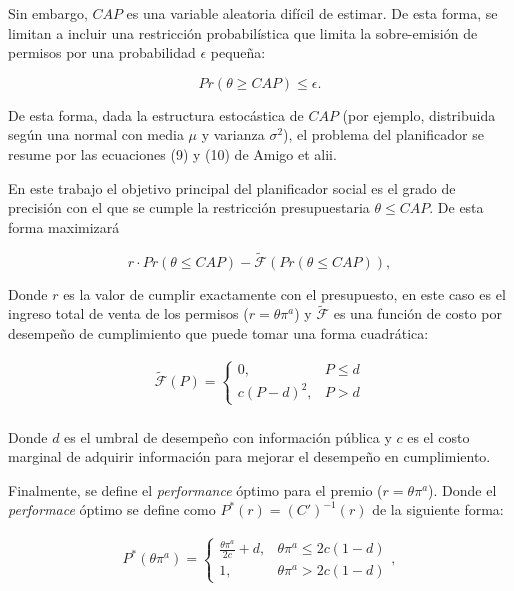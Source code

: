 Sin embargo, $CAP$ es una variable aleatoria difícil de estimar. De esta forma,  se limitan a incluir una restricción probabilística que limita la sobre-emisión de permisos por una probabilidad $\epsilon$ pequeña:

$$Pr(\theta\geq CAP)\leq\epsilon.$$

De esta forma, dada la estructura estocástica de $CAP$ (por ejemplo, distribuida según una normal con media $\mu$ y varianza $\sigma^2$), el problema del planificador se resume por las ecuaciones (9) y (10) de Amigo et alii.
\vspace{2.5mm}

En este trabajo el objetivo principal del planificador social es el grado de precisión con el que se cumple la restricción presupuestaria $\theta\leq CAP$. De esta forma maximizará

$$r\cdot Pr(\theta\leq CAP)-\tilde{\mathcal{F}}(Pr(\theta\leq CAP)),$$ \label{nuevafposible}

Donde $r$ es la valor de cumplir exactamente con el presupuesto, en este caso es el ingreso total de venta de los permisos ($r = \theta \pi^a$) y $\tilde{\mathcal{F}}$ es una función de costo por desempeño de cumplimiento que puede tomar una forma cuadrática:

\begin{equation}
\begin{array}{rrclcl}
    \tilde{\mathcal{F}}(P)=\begin{cases}0,&P\leq d\\c(P-d)^2,&P>d\end{cases}\label{costoperformace}\\
\end{array}
\end{equation}

Donde $d$ es el umbral de desempeño con información pública y $c$ es el costo marginal de adquirir información para mejorar el desempeño en cumplimiento.
\vspace{2.5mm}

Finalmente, se define el \emph{performance} óptimo para el premio ($r = \theta \pi^a$). Donde el \emph{performace} óptimo  se define como $P^*(r) = (C')^{-1}(r)$ de la siguiente forma:

\begin{equation}
\begin{array}{rrclcl}
    P^*(\theta \pi^a) = \begin{cases}\frac{\theta \pi^a}{2c}+d,&\theta \pi^a\leq 2c(1-d)\\1,&\theta \pi^a>2c(1-d)\end{cases}, \label{performaceoptimo}\\
\end{array}
\end{equation}

